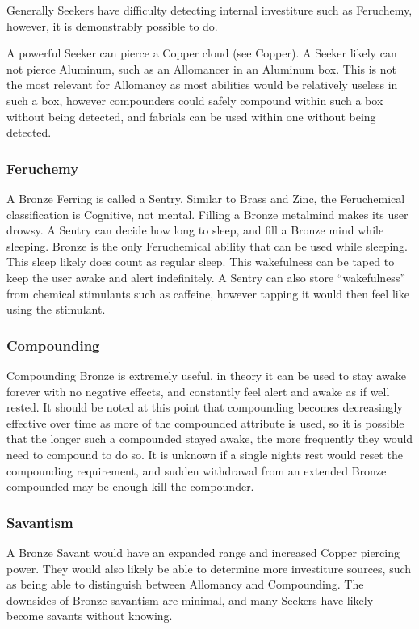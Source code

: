 \documentclass[conference]{IEEEtran}
\begin{document}
Generally Seekers have difficulty detecting internal investiture such as Feruchemy,\cite{seek-FE} however, it is demonstrably possible to do.\cite{TLM-CH25} 

A powerful Seeker can pierce a Copper cloud (see Copper).\cite{TFE-CH31}
A Seeker likely can not pierce Aluminum, such as an Allomancer in an Aluminum box.\cite{OB-CH81}  This is not the most relevant for Allomancy as most abilities would be relatively useless in such a box, however compounders could safely compound within such a box without being detected, and fabrials can be used within one without being detected.\\
\subsubsection*{\textbf{Feruchemy}}
A Bronze Ferring is called a Sentry.\cite{ARS}  Similar to Brass and Zinc, the Feruchemical classification is Cognitive, not mental.\cite{FE-TB}  Filling a Bronze metalmind makes its user drowsy.\cite{ARS}  A Sentry can decide how long to sleep, and fill a Bronze mind while sleeping. Bronze is the only Feruchemical ability that can be used while sleeping.\cite{WoA-CH57} This sleep likely does count as regular sleep.\cite{TFE-CH22}  This wakefulness can be taped to keep the user awake and alert indefinitely.  A Sentry can also store ``wakefulness'' from chemical stimulants such as caffeine, however tapping it would then feel like using the stimulant.\cite{BZ-FE-Chem}\\
\subsubsection*{\textbf{Compounding}}
Compounding Bronze is extremely useful, in theory it can be used to stay awake forever with no negative effects, and constantly feel alert and awake as if well rested.\cite{bronze-comp}  It should be noted at this point that compounding becomes decreasingly effective over time as more of the compounded attribute is used, so it is possible that the longer such a compounded stayed awake, the more frequently they would need to compound to do so.\cite{AoL-CH13}\cite{TFE-CH38}  It is unknown if a single nights rest would reset the compounding requirement, and sudden withdrawal from an extended Bronze compounded may be enough kill the compounder.\\
\subsubsection*{\textbf{Savantism}}
A Bronze Savant would have an expanded range and increased Copper piercing power.\cite{WoF}\cite{savant-pierce}\cite{seeker-savant-compound}  They would also likely be able to determine more investiture sources, such as being able to distinguish between Allomancy and Compounding.\cite{seeker-savant-compound}
The downsides of Bronze savantism are minimal, and many Seekers have likely become savants without knowing.\cite{WoF}\cite{savant-pierce}\\
\end{document}
